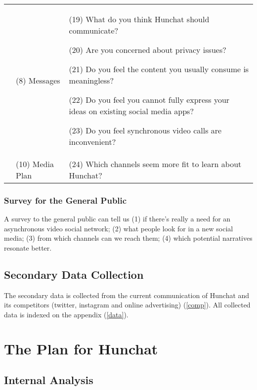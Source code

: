 \documentclass[12pt]{article}
\begin{document}
\begin{table}[htb]
\begin{tabular}{ @{}P{0.15\textwidth}P{0.2\textwidth}P{0.6\textwidth}@{} }
	& (8) Messages &  (19) What do you think Hunchat should communicate? \par (20) Are you concerned about privacy issues? \par (21) Do you feel the content you usually consume is meaningless? \par (22) Do you feel you cannot fully express your ideas on existing social media apps? \par (23) Do you feel synchronous video calls are inconvenient?  \\
                                   & (10) Media Plan        & (24) Which channels seem more fit to learn about Hunchat?                                                                                                                                                                                                                                                                                                       \\ \hline
\end{tabular}
\end{table}


\subsubsection{Survey for the General Public}
A survey to the general public can tell us (1) if there's really a need for an asynchronous video social network; (2) what people look for in a new social media; (3) from which channels can we reach them; (4) which potential narratives resonate better.

\subsection{Secondary Data Collection}
The secondary data is collected from the current communication of Hunchat and its competitors (twitter, instagram and online advertising) (\ref{comp}). All collected data is indexed on the appendix (\ref{data}).

\section{The Plan for Hunchat}\label{plan}

\subsection{Internal Analysis}
\end{document}

